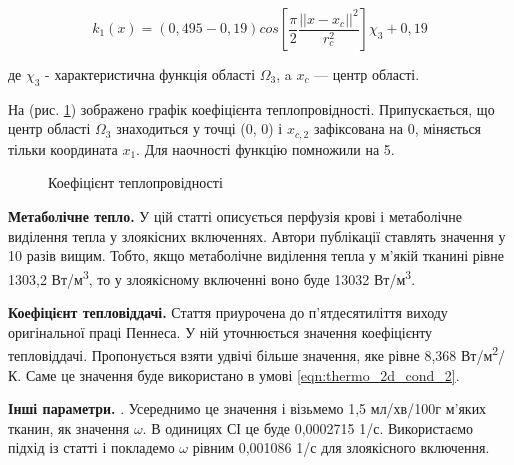 \begin{equation}
    \label{eqn:thermo_2d_thermal_conductivity}
    k_1(x) = (0,495 - 0,19)cos\left[\frac{\pi}{2}\frac{||x-x_c||^2}{r_c^2}\right]\chi_3 + 0,19
\end{equation}

\noindent де $\chi_3$ - характеристична функція області $\Omega_3$, a $x_c$ --- центр області.

\noindent На (рис. \ref{fig:thermo_2d_thermal_conductivity}) зображено графік коефіцієнта теплопровідності. 
Припускається, що центр області $\Omega_3$ знаходиться у точці (0, 0) і $x_{c,2}$ зафіксована на 0, міняється тільки 
координата $x_1$. Для наочності функцію помножили на 5. 

\begin{figure}[ht!]
    \centering
    \caption{Коефіцієнт теплопровідності}
    \label{fig:thermo_2d_thermal_conductivity}
\end{figure}

\textbf{Метаболічне тепло.} У цій статті \cite{metabolic-heat-exchange-value-tumor} описується перфузія крові і 
метаболічне виділення тепла у злоякісних включеннях. Автори публікації ставлять значення у 10 разів вищим. Тобто, якщо 
метаболічне виділення тепла у м'якій тканині рівне 1303,2 Вт/м\textsuperscript{3}, то у злоякісному включенні воно буде 
13032 Вт/м\textsuperscript{3}.

\textbf{Коефіцієнт тепловіддачі.} Стаття \cite{thermal-process-tissue-pennes-explained} приурочена до п'ятдесятиліття 
виходу оригінальної праці Пеннеса. У ній уточнюється значення коефіцієнту тепловіддачі. Пропонується взяти удвічі більше 
значення, яке рівне 8,368 Вт/м\textsuperscript{2}/К. Саме це значення буде використано в умові 
\ref{eqn:thermo_2d_cond_2}.

\textbf{Інші параметри.} \cite[Пеннес змоделював руку як довгий цилінд і обчислив стаціонарний розроділ температури. 
У його моделі не можна було просто виміряти перфузію крові через м'які тканини $\omega$, тому Пеннес узгодив цей 
параметр із експерементальними даними для фіксованої температури навколишнього середовища і метаболічного виділення 
тепла. Він отримав значення перфузії крові $\omega$ між 1,2 і 1,8 мл/хв/100г м'яких тканин, що є типовими діапазоном 
значень для м'язів людської руки у стані спокою]{kutz-zhu-heat-transfer-biological-systems}. Усереднимо це значення і 
візьмемо 1,5 мл/хв/100г м'яких тканин, як значення $\omega$. В одиницях СІ це буде 0,0002715 1/с. Використаємо підхід
із статті \cite{metabolic-heat-exchange-value-tumor} і покладемо $\omega$ рівним 0,001086 1/с для злоякісного включення.

